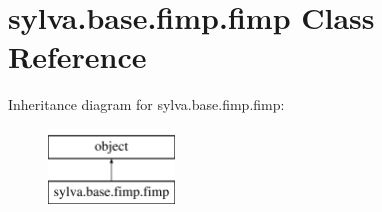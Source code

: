 \hypertarget{classsylva_1_1base_1_1fimp_1_1fimp}{}\section{sylva.\+base.\+fimp.\+fimp Class Reference}
\label{classsylva_1_1base_1_1fimp_1_1fimp}
Inheritance diagram for sylva.\+base.\+fimp.\+fimp\+:\begin{figure}[H]
\begin{center}
\leavevmode
\includegraphics[height=2.000000cm]{classsylva_1_1base_1_1fimp_1_1fimp}
\end{center}
\end{figure}
